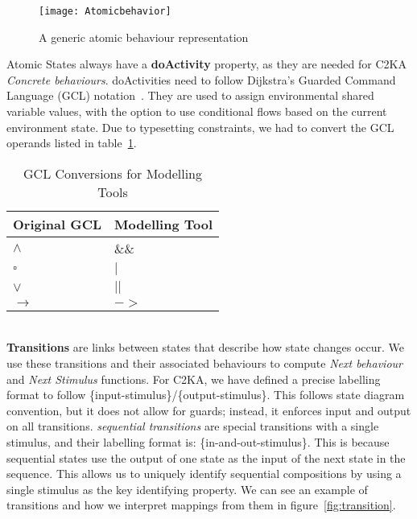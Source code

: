 \begin{figure}[ht]
    \centering
    \texttt{[image: Atomicbehavior]}
    \caption{A generic atomic behaviour representation}
    \label{fig:atomicbehaviour}
\end{figure}

Atomic States always have a \textbf{doActivity} property,
as they are needed for C2KA \textit{Concrete behaviours}.
doActivities need to follow Dijkstra's Guarded Command Language (GCL) notation~\cite{gcl}.
They are used to assign environmental shared variable values,
with the option to use conditional flows based on the current environment state.
Due to typesetting constraints, we had to convert the GCL operands listed in table~\ref{tab:gcl-equivalence}.
\begin{table}[htbp]
    \centering
    \caption{GCL Conversions for Modelling Tools}\label{tab:gcl-equivalence}
    \begin{tabular}{| l | l |}
        \hline
        \textbf{Original GCL} & \textbf{Modelling Tool} \\
        \hline
        $\land$ & \&\& \\ \hline
        $\square$ & $|$ \\ \hline
        $\lor$ & $||$ \\ \hline
        $\rightarrow$ & $->$ \\ \hline
    \end{tabular}
\end{table}
\\

\textbf{Transitions} are links between states that describe how state changes occur.
We use these transitions and their associated behaviours to compute \textit{Next behaviour} and \textit{Next Stimulus} functions.
For C2KA, we have defined a precise labelling format to follow \{input-stimulus\}/\{output-stimulus\}.
This follows state diagram convention, but it does not allow for guards; instead, it enforces input and output on all transitions.
\textit{sequential transitions} are special transitions with a single stimulus, and their labelling format is: \{in-and-out-stimulus\}.
This is because sequential states use the output of one state as the input of the next state in the sequence.
This allows us to uniquely identify sequential compositions by using a single stimulus as the key identifying property.
We can see an example of transitions and how we interpret mappings from them in figure~\ref{fig:transition}.

